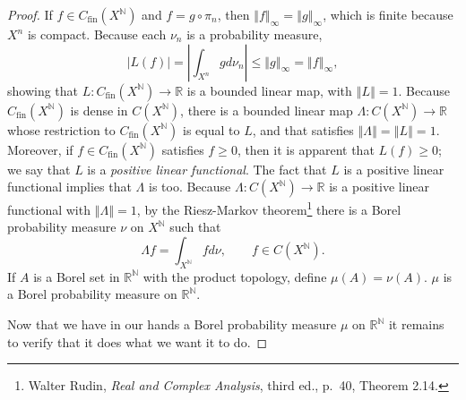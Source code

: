 \documentclass{article}
\newcommand{\norm}[1]{\left\Vert #1 \right\Vert}
\theoremstyle{definition}
\theoremstyle{definition}
\begin{document}
\begin{proof}
If $f \in C_{\mathrm{fin}}(X^\mathbb{N})$
and $f = g \circ \pi_n$, then $\norm{f}_\infty  = \norm{g}_\infty$, which is finite because $X^n$ is compact. 
Because each $\nu_n$ is a probability measure,
\[
|L(f)| =\left| \int_{X^n} gd\nu_n \right| \leq \norm{g}_\infty = \norm{f}_\infty,
\]
showing that $L:C_{\mathrm{fin}}(X^\mathbb{N}) \to \mathbb{R}$ is a bounded linear map, with $\norm{L}=1$.
Because $C_{\mathrm{fin}}(X^\mathbb{N})$ is dense in $C(X^\mathbb{N})$, 
there is a bounded linear map $\Lambda:C(X^\mathbb{N}) \to \mathbb{R}$ whose restriction to $C_{\mathrm{fin}}(X^\mathbb{N})$ is equal to $L$, and
that satisfies $\norm{\Lambda}=\norm{L}=1$.
Moreover, if $f \in C_{\mathrm{fin}}(X^\mathbb{N})$ satisfies $f \geq 0$, then it is apparent that $L(f) \geq 0$; we say that $L$ is a {\em positive linear
functional}. The fact that $L$ is a positive linear functional implies that $\Lambda$ is too. Because $\Lambda:C(X^\mathbb{N}) \to \mathbb{R}$ is a
positive linear functional with $\norm{\Lambda}=1$, by the Riesz-Markov theorem\footnote{Walter Rudin, {\em Real and 
Complex Analysis}, third ed., p.~40, Theorem 2.14.}
 there is a  Borel probability measure $\nu$ on $X^\mathbb{N}$ such that 
\[
\Lambda f = \int_{X^\mathbb{N}} f d\nu, \qquad f \in C(X^\mathbb{N}).
\]
If $A$ is a Borel set in $\mathbb{R}^\mathbb{N}$ with the product topology, define $\mu(A)=\nu(A)$.  $\mu$ is a Borel probability
measure on $\mathbb{R}^\mathbb{N}$. 

Now that we have in our hands a Borel probability measure $\mu$ on $\mathbb{R}^\mathbb{N}$ it remains to verify that it does what
we want it to do.
\end{proof}
\end{document}
